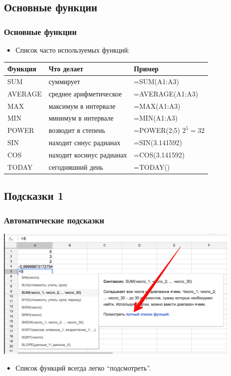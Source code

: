 \documentclass[compress,red]{beamer}
\begin{document}
\subsection{Основные функции}
\begin{frame}[fragile]
  \frametitle{Основные функции}
  \begin{itemize}
    \item Список часто используемых функций:
  \end{itemize}
  \begin{tabular}{|l|l|l|}
      \hline
      Функция & Что делает & Пример \\
      \hline
      SUM & суммирует & =SUM(A1:A3) \\
      \hline
      AVERAGE & среднее арифметическое & =AVERAGE(A1:A3) \\
      \hline
      MAX & максимум в интервале & =MAX(A1:A3) \\
      \hline
      MIN & минимум в интервале & =MIN(A1:A3) \\
      \hline
      POWER & возводит в степень & =POWER(2;5) $2^5 = 32$ \\
      \hline
      SIN & находит синус радианах & =SIN(3.141592) \\
      \hline
      COS & находит косинус радианах & =COS(3.141592) \\
      \hline
      TODAY & сегодняшний день & =TODAY() \\
      \hline
  \end{tabular}
\end{frame}

\subsection{Подсказки 1}
\begin{frame}[fragile]
  \frametitle{Автоматические подсказки}
  \centerline{\includegraphics[width=0.9\textwidth]{images/10.png}}
  \begin{itemize}
      \item Список функций всегда легко ``подсмотреть''.
  \end{itemize}
\end{frame}
\end{document}
